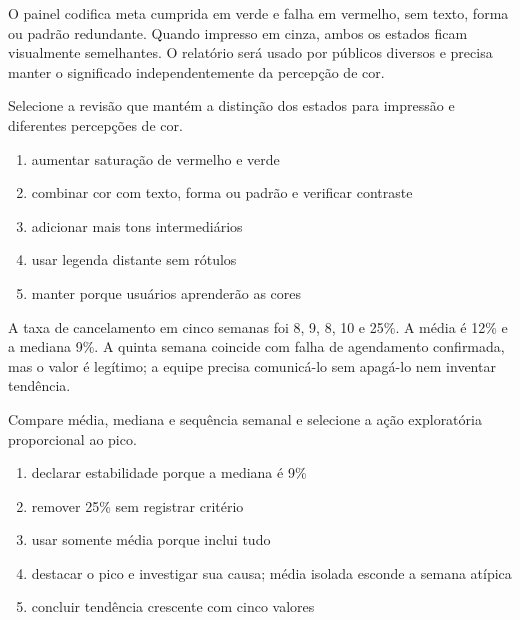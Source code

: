 
\TextoBase

O painel codifica meta cumprida em verde e falha em vermelho, sem texto, forma ou padrão redundante. Quando impresso em cinza, ambos os estados ficam visualmente semelhantes. O relatório será usado por públicos diversos e precisa manter o significado independentemente da percepção de cor.

\FonteDidatica

\Comando Selecione a revisão que mantém a distinção dos estados para impressão e diferentes percepções de cor.

\begin{enumerate}[label=\Alph*)]

\item aumentar saturação de vermelho e verde

\item combinar cor com texto, forma ou padrão e verificar contraste

\item adicionar mais tons intermediários

\item usar legenda distante sem rótulos

\item manter porque usuários aprenderão as cores

\end{enumerate}


\TextoBase

A taxa de cancelamento em cinco semanas foi 8, 9, 8, 10 e 25\%. A média é 12\% e a mediana 9\%. A quinta semana coincide com falha de agendamento confirmada, mas o valor é legítimo; a equipe precisa comunicá-lo sem apagá-lo nem inventar tendência.

\FonteDidatica

\Comando Compare média, mediana e sequência semanal e selecione a ação exploratória proporcional ao pico.

\begin{enumerate}[label=\Alph*)]

\item declarar estabilidade porque a mediana é 9\%

\item remover 25\% sem registrar critério

\item usar somente média porque inclui tudo

\item destacar o pico e investigar sua causa; média isolada esconde a semana atípica

\item concluir tendência crescente com cinco valores

\end{enumerate}

